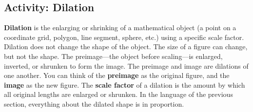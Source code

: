 \wbnewpage
\subsection{Activity: Dilation}
\textbf{Dilation} is the enlarging or shrinking of a mathematical object (a point on a coordinate grid, polygon, line segment, sphere, etc.) using a specific scale factor. Dilation does not change the shape of the object. The size of a figure can change, but not the shape. The preimage---the object before scaling---is enlarged, inverted, or shrunken to form the image. The preimage and image are dilations of one another. You can think of the \textbf{preimage} as the original figure, and the \textbf{image} as the new figure. The \textbf{scale factor} of a dilation is the amount by which all original lengths are enlarged or shrunken. In the language of the previous section, everything about the dilated shape is in proportion.
